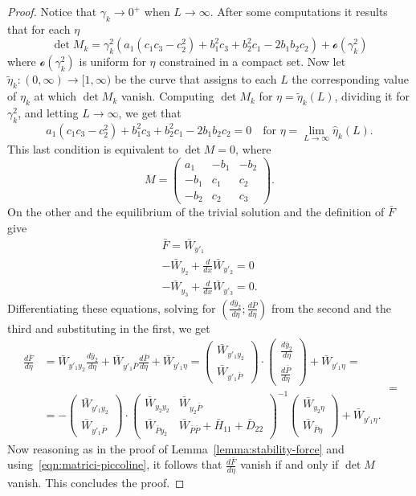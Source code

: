 \documentclass[a4paper,10pt,oneside]{amsbook}
\numberwithin{section}{chapter}
\numberwithin{equation}{chapter}
\theoremstyle{definition}
\begin{document}
\begin{proof}
Notice that $\gamma_k\to0^+$ when $L\to\infty$. After some computations it results that for each $\eta$
\[
\det M_k=\gamma_k^2(a_1(c_1c_3 - c_2^2) + b_1^2c_3 + b_2^2c_1 - 2b_1b_2c_2)+\mathscr{o}(\gamma_k^2)
\]
where $\mathscr{o}(\gamma_k^2)$ is uniform for $\eta$ constrained in a compact set. Now let $\tilde\eta_k\colon(0,\infty)\to[1,\infty)$ be the curve that assigns to each $L$ the corresponding value of $\eta_k$ at which $\det M_k$ vanish. Computing $\det M_k$ for $\eta=\tilde\eta_k(L)$, dividing it for $\gamma_k^2$, and letting $L\to\infty$, we get that
\[
a_1(c_1c_3 - c_2^2) + b_1^2c_3 + b_2^2c_1 - 2b_1b_2c_2=0\quad\text{for $\eta=\lim_{L\to\infty}\hat{\eta}_k(L)$.}
\]
This last condition is equivalent to $\det M=0$, where
\[
M=\begin{pmatrix}
    a_1  & -b_1 & -b_2 \\
    -b_1 &  c_1 &  c_2 \\
    -b_2 &  c_2 &  c_3
\end{pmatrix}.
\]
On the other and the equilibrium of the trivial solution and the definition of $\bar F$ give
\begin{gather*}
\bar{F} = \bar{W}_{y'_1} \\
-\bar{W}_{y_2} + \frac{d}{dx} \bar{W}_{y'_2} = 0 \\
-\bar{W}_{y_3} + \frac{d}{dx} \bar{W}_{y'_3} = 0.
\end{gather*}
Differentiating these equations, solving for $\left(\frac{d\bar y_2}{d\eta};\frac{d\bar P}{d\eta}\right)$ from the second and the third and substituting in the first, we get
\[
\begin{split}
\frac{d\bar{F}}{d\eta} &= \bar{W}_{y'_1 y_2} \frac{d\bar{y}_2}{d\eta} + \bar{W}_{y'_1 \bar{P}} \frac{d\bar{P}}{d\eta} + \bar{W}_{y'_1 \eta} = 
\begin{pmatrix} \bar{W}_{y'_1 y_2} \\ \bar{W}_{y'_1 \bar{P}} \end{pmatrix} \cdot 
\begin{pmatrix} \frac{d\bar{y}_2}{d\eta} \\ \frac{d\bar{P}}{d\eta} \end{pmatrix} + \bar{W}_{y'_1 \eta}=\\
&=- \begin{pmatrix} \bar{W}_{y'_1 y_2} \\ \bar{W}_{y'_1 \bar{P}} \end{pmatrix} \cdot 
\begin{pmatrix} 
    \bar{W}_{y_2 y_2} & \bar{W}_{y_2 \bar{P}} \\ 
    \bar{W}_{\bar{P} y_2} & \bar{W}_{\bar{P} \bar{P}} + \bar{H}_{11} + \bar{D}_{22} 
\end{pmatrix}^{-1} 
\begin{pmatrix} \bar{W}_{y_2 \eta} \\ \bar{W}_{\bar{P} \eta} \end{pmatrix} + \bar{W}_{y'_1 \eta}.
\end{split}=
\]
Now reasoning as in the proof of Lemma~\ref{lemma:stability-force} and using~\eqref{eqn:matrici-piccoline}, it follows that $\frac{d\bar{F}}{d\eta}$ vanish if and only if $\det M$ vanish. This concludes the proof.
\end{proof}
\end{document}
